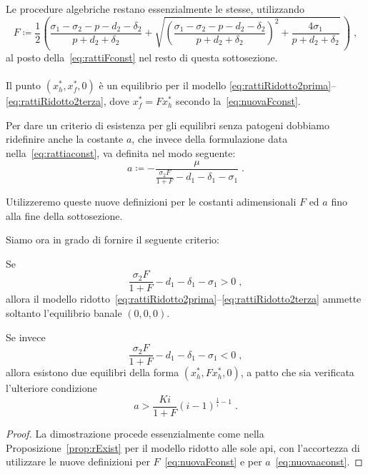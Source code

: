 Le procedure algebriche restano essenzialmente le stesse, utilizzando
\begin{equation}
F \coloneq \frac{1}{2} \left( \frac{ \sigma_1 - \sigma_2 - p - d_2 -\delta_2}{p+d_2+\delta_2} +
    \sqrt{ {\left( \frac{ \sigma_1 - \sigma_2 - p - d_2 -\delta_2 }{p+d_2+\delta_2} \right)}^2 + \frac{4 \sigma_1}{p+d_2+\delta_2} } \, \right) \; ,
    \label{eq:nuovaFconst}
\end{equation}
al posto della~\eqref{eq:rattiFconst} nel resto di questa sottosezione.

\paragraph{}
Il punto $(x_h^*, x_f^*, 0)$ è un equilibrio per il modello \eqref{eq:rattiRidotto2prima}--\eqref{eq:rattiRidotto2terza}, dove $x_f^* = F x_h^*$ secondo la~\eqref{eq:nuovaFconst}.

Per dare un criterio di esistenza per gli equilibri senza patogeni dobbiamo ridefinire anche la costante $a$,
che invece della formulazione data nella~\eqref{eq:rattiaconst}, va definita nel modo seguente:
\begin{equation}
    a \coloneq - \frac{\mu}{ \frac{\sigma_2 F}{1+F} - d_1 -\delta_1 - \sigma_1}
    \; .
\label{eq:nuovaaconst}
\end{equation}

Utilizzeremo queste nuove definizioni per le costanti adimensionali $F$ ed $a$ fino alla fine della sottosezione.

Siamo ora in grado di fornire il seguente criterio:

\begin{proposizione}
Se
$$\frac{\sigma_2 F}{1+F} - d_1 -\delta_1 -\sigma_1 > 0 \; ,$$
allora il modello ridotto~\eqref{eq:rattiRidotto2prima}--\eqref{eq:rattiRidotto2terza} ammette
soltanto l'equilibrio banale $(0,0,0)$.

Se invece
$$\frac{\sigma_2 F}{1+F} - d_1 -\delta_1 -\sigma_1 < 0 \; ,$$
allora esistono due equilibri della forma $(x_h^*, F x_h^*, 0)$,
a patto che sia verificata l'ulteriore condizione
$$a > \frac{Ki}{1+F} {(i-1)}^{\frac{1}{i} -1} \; .$$
\label{prop:exist3D}
\end{proposizione}

\begin{proof}
La dimostrazione procede essenzialmente come nella Proposizione~\ref{prop:rExist} per il modello ridotto alle sole api,
con l'accortezza di utilizzare le nuove definizioni per $F$~\eqref{eq:nuovaFconst} e per $a$~\eqref{eq:nuovaaconst}.
\end{proof}

